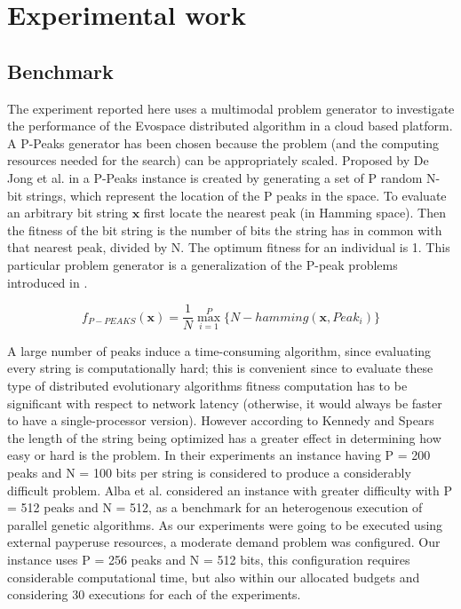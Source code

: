 \documentclass{llncs}
\begin{document}
\section{Experimental work}
\subsection{Benchmark}
\label{ss:benchmark}
The experiment reported here uses a multimodal problem generator to
investigate the performance of the Evospace distributed algorithm in a
cloud based platform. A P-Peaks generator has been chosen because the problem
(and the computing resources needed for the search) can be appropriately scaled.
Proposed by De Jong et al. in \cite{Jong:PS97} a
P-Peaks instance is created by generating a set of P random N-bit
strings, which represent the location of the P peaks in the space. To
evaluate an arbitrary bit string \begin{math} \mathbf{x} \end{math}
first locate the nearest peak (in Hamming space). Then the fitness of
the bit string is the number of bits the string has in common with
that nearest peak, divided by N. The optimum fitness for an individual
is 1. This particular problem generator is a generalization of the
P-peak problems introduced in \cite{Jong:1990}.             %

\begin{equation}
f_{P-PEAKS}(\mathbf{x})=\frac{1}{N} \overset{P}{\max_{i=1}} \{N-hamming(\mathbf{x},Peak_i)   \}
\end{equation}

A large number of peaks induce a time-consuming algorithm,
since evaluating every string is computationally hard; this is
convenient since to evaluate these type of distributed evolutionary
algorithms fitness computation has to be significant with respect to
network latency (otherwise, it would always be faster to have a
single-processor version). However
according to Kennedy and Spears \cite{Kennedy:1998ch} the length of
the string being optimized has a greater effect in determining how
easy or hard is the problem. In their experiments an instance having P
= 200 peaks and N = 100 bits per string is considered to produce a
considerably difficult problem. Alba et al. \cite{Alba:2002dq}
considered an instance with greater difficulty with P = 512 peaks and
N = 512, as a benchmark for an heterogenous execution of parallel
genetic algorithms. As our  experiments were going to be executed
using external pay\textendash per\textendash use resources, a moderate
demand problem was configured. Our instance uses P = 256 peaks and N =
512 bits, this configuration requires considerable computational time,
but also within our allocated budgets and considering 30 executions for each of the experiments.
\end{document}
